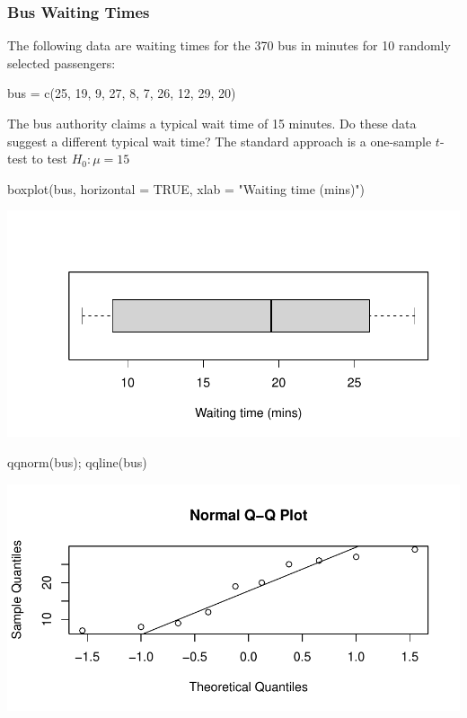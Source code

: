 \documentclass[a4paper]{article}\usepackage[]{graphicx}\usepackage[]{xcolor}
\makeatletter
\def\maxwidth{ %
  \ifdim\Gin@nat@width>\linewidth
    \linewidth
  \else
    \Gin@nat@width
  \fi
}
\makeatother
\begin{document}
\subsubsection{Bus Waiting Times}
The following data are waiting times for the 370 bus in minutes for 10 randomly selected passengers:
\begin{Schunk}
\begin{Sinput}
bus = c(25, 19, 9, 27, 8, 7, 26, 12, 29, 20)
\end{Sinput}
\end{Schunk}
The bus authority claims a typical wait time of 15 minutes. Do these data suggest a different typical wait time?
The standard approach is a one-sample \( t \)-test to test \( H_0: \mu = 15 \)
\begin{Schunk}
\begin{Sinput}
boxplot(bus, horizontal = TRUE, 
    	xlab = "Waiting time (mins)")
\end{Sinput}


{\centering \includegraphics[width=\maxwidth]{figure/listings-unnamed-chunk-111-1} 

}

\begin{Sinput}
qqnorm(bus); qqline(bus)
\end{Sinput}


{\centering \includegraphics[width=\maxwidth]{figure/listings-unnamed-chunk-111-2} 

}

\end{Schunk}
\end{document}
